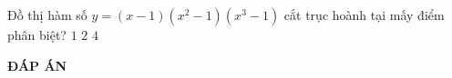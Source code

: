 \begin{ex}%
Đồ thị hàm số $y=(x-1)\left(x^2-1\right)\left(x^3-1\right)$ cắt trục hoành tại mấy điểm phân biệt?
{$1$}
{\True $2$}
{$4$}
\end{ex}
\newpage
\begin{center}
	\textbf{ĐÁP ÁN}
\end{center}
\begin{multicols}{10}
	 
\end{multicols}